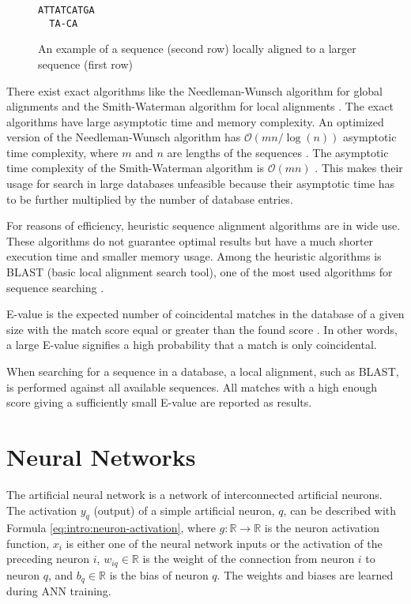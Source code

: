 \begin{figure}
\centering
\begin{BVerbatim}[baselinestretch=0.75]
ATTATCATGA
  TA-CA
\end{BVerbatim}
\caption{An example of a sequence (second row) locally aligned to a larger
  sequence (first row)}
\label{fig:background:local-alignment}
\end{figure}

There exist exact algorithms like the Needleman-Wunsch algorithm for global
alignments \cite{needleman1970general} and the Smith-Waterman algorithm for
local alignments \cite{smith1981identification}. The exact algorithms have
large asymptotic time and memory complexity. An optimized version of the
Needleman-Wunsch algorithm has $\mathcal{O}(mn / \log(n))$ asymptotic time
complexity, where $m$ and $n$ are lengths of the sequences
\cite[p.~35]{sung2009algorithms}. The asymptotic time complexity of the
Smith-Waterman algorithm is $\mathcal{O}(mn)$ \cite[p.~40]{sung2009algorithms}.
This makes their usage for search in large databases unfeasible because their
asymptotic time has to be further multiplied by the number of database entries.

For reasons of efficiency, heuristic sequence alignment algorithms are in wide
use. These algorithms do not guarantee optimal results but have a much shorter
execution time and smaller memory usage. Among the heuristic algorithms is
BLAST (basic local alignment search tool), one of the most used algorithms for
sequence searching \cite{casey2005blast}.

E-value is the expected number of coincidental matches in the database of a
given size with the match score equal or greater than the found score
\cite[p.~119]{sung2009algorithms}. In other words, a large E-value signifies a
high probability that a match is only coincidental.

When searching for a sequence in a database, a local alignment, such as BLAST,
is performed against all available sequences. All matches with a high enough
score giving a sufficiently small E-value are reported as results.

\section{Neural Networks}

The artificial neural network is a network of interconnected artificial
neurons. The activation $y_q$ (output) of a simple artificial neuron, $q$, can
be described with Formula \ref{eq:intro:neuron-activation}, where $g:
\mathbb{R} \rightarrow \mathbb{R}$ is the neuron activation function, $x_i$ is
either one of the neural network inputs or the activation of the preceding
neuron $i$, $w_{iq} \in \mathbb{R}$ is the weight of the connection from neuron
$i$ to neuron $q$, and $b_q \in \mathbb{R}$ is the bias of neuron $q$. The
weights and biases are learned during ANN training.

